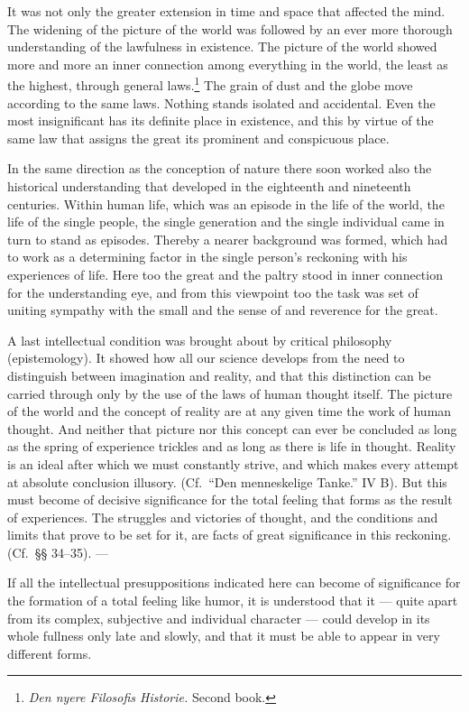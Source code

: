 \documentclass[12pt]{book}
\newcommand{\opage}[1]{\marginnote{\footnotesize\textit{[#1]}}}
\begin{document}
It was not only the greater extension in time and space that affected the mind. The widening of
the picture of the world was followed by an ever more thorough understanding of the lawfulness in
existence. The picture of the world showed more and more an inner connection among everything in
the world, the least as the highest, through general laws.\footnote{\textit{Den nyere Filosofis
Historie.} Second book.} The grain of dust and the globe move according to the same laws.
Nothing stands isolated and accidental. Even the most insignificant has its definite place in
existence, and this by virtue of the same law that assigns the great its prominent and
conspicuous place.

In the same direction as the conception of nature there soon worked also the historical
understanding that developed in the eighteenth and nineteenth centuries. Within human life,
which was an episode in the life of the world, the life of the single people, the single
generation and the single individual came in turn to stand as episodes. Thereby \opage{144}a
nearer background was formed, which had to work as a determining factor in the single person's
reckoning with his experiences of life. Here too the great and the paltry stood in inner
connection for the understanding eye, and from this viewpoint too the task was set of uniting
sympathy with the small and the sense of and reverence for the great.

A last intellectual condition was brought about by critical philosophy (epistemology). It showed
how all our science develops from the need to distinguish between imagination and reality, and
that this distinction can be carried through only by the use of the laws of human thought
itself. %
The picture of the world and the concept of reality are at any given time the work of human
thought. And neither that picture nor this concept can ever be concluded as long as the spring
of experience trickles and as long as there is life in thought. Reality is an ideal after which
we must constantly strive, and which makes every attempt at absolute conclusion illusory. (Cf.\
``Den menneskelige Tanke.'' IV B). But this must become of decisive significance for the total
feeling that forms as the result of experiences. The struggles and victories of thought, and the
conditions and limits that prove to be set for it, are facts of great significance in this
reckoning. (Cf.\ §§ 34--35). ---

If all the intellectual presuppositions indicated here can become of significance for the
formation of a total feeling like humor, it is understood that it --- quite apart from its
complex, subjective and individual character --- could develop in its whole fullness only late
and slowly, and that it must be able to appear in very different forms.
\end{document}
